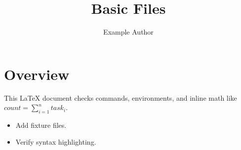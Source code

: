 \documentclass{article}
\title{Basic Files}
\author{Example Author}
\begin{document}
\maketitle

\section{Overview}

This \LaTeX{} document checks commands, environments, and inline math like
\( count = \sum_{i=1}^{n} task_i \).

\begin{itemize}
  \item Add fixture files.
  \item Verify syntax highlighting.
\end{itemize}
\end{document}
